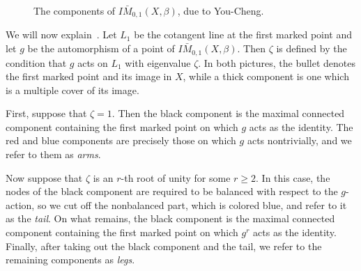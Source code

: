 \begin{figure}[htpb]
    \caption{The components of \(I\bar{M}_{0,1}(X,\beta)\), due to You-Cheng.}
    \label{fig:adelic-components}
\end{figure}

We will now explain~. Let \(L_1\) be the cotangent line at the first marked point and let \(g\) be the automorphism of a point of \(I\bar{M}_{0,1}(X,\beta)\). Then \(\zeta\) is defined by the condition that \(g\) acts on \(L_1\) with eigenvalue \(\zeta\). In both pictures, the bullet denotes the first marked point and its image in \(X\), while a thick component is one which is a multiple cover of its image.

First, suppose that \(\zeta = 1\). Then the black component is the maximal connected component containing the first marked point on which \(g\) acts as the identity. The red and blue components are precisely those on which \(g\) acts nontrivially, and we refer to them as \textit{arms}.

Now suppose that \(\zeta\) is an \(r\)-th root of unity for some \(r \geq 2\). In this case, the nodes of the black component are required to be balanced with respect to the \(g\)-action, so we cut off the nonbalanced part, which is colored blue, and refer to it as the \textit{tail}. On what remains, the black component is the maximal connected component containing the first marked point on which \(g^r\) acts as the identity. Finally, after taking out the black component and the tail, we refer to the remaining components as \textit{legs}.

